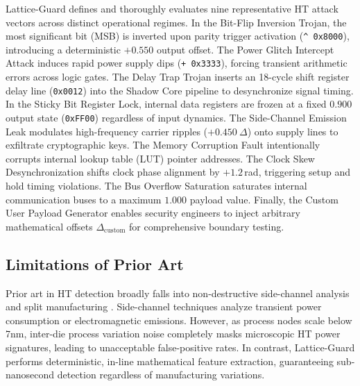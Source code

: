 \documentclass[conference]{IEEEtran}
\begin{document}
Lattice-Guard defines and thoroughly evaluates nine representative HT attack vectors across distinct operational regimes. In the Bit-Flip Inversion Trojan, the most significant bit (MSB) is inverted upon parity trigger activation (\texttt{\^{} 0x8000}), introducing a deterministic $+0.550$ output offset. The Power Glitch Intercept Attack induces rapid power supply dips (\texttt{+ 0x3333}), forcing transient arithmetic errors across logic gates. The Delay Trap Trojan inserts an 18-cycle shift register delay line (\texttt{0x0012}) into the Shadow Core pipeline to desynchronize signal timing. In the Sticky Bit Register Lock, internal data registers are frozen at a fixed $0.900$ output state (\texttt{0xFF00}) regardless of input dynamics. The Side-Channel Emission Leak modulates high-frequency carrier ripples ($+0.450\ \Delta$) onto supply lines to exfiltrate cryptographic keys. The Memory Corruption Fault intentionally corrupts internal lookup table (LUT) pointer addresses. The Clock Skew Desynchronization shifts clock phase alignment by $+1.2$\,rad, triggering setup and hold timing violations. The Bus Overflow Saturation saturates internal communication buses to a maximum $1.000$ payload value. Finally, the Custom User Payload Generator enables security engineers to inject arbitrary mathematical offsets $\Delta_{\text{custom}}$ for comprehensive boundary testing.

\subsection{Limitations of Prior Art}
Prior art in HT detection broadly falls into non-destructive side-channel analysis \cite{jin2010hardware} and split manufacturing \cite{rajendran2015split}. Side-channel techniques analyze transient power consumption or electromagnetic emissions. However, as process nodes scale below 7nm, inter-die process variation noise completely masks microscopic HT power signatures, leading to unacceptable false-positive rates. In contrast, Lattice-Guard performs deterministic, in-line mathematical feature extraction, guaranteeing sub-nanosecond detection regardless of manufacturing variations.
\end{document}
